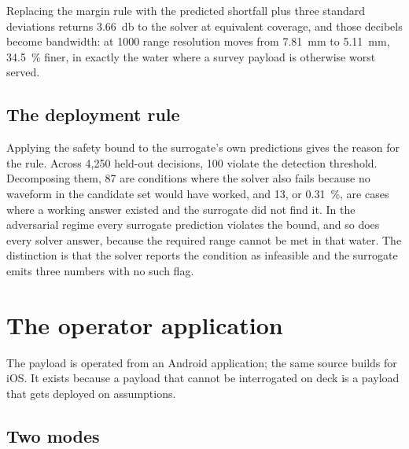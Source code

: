 \documentclass[11pt,a4paper]{article}
\begin{document}
Replacing the margin rule with the predicted shortfall plus three standard
deviations returns \SI{3.66}{\decibel} to the solver at equivalent coverage,
and those decibels become bandwidth: at \SI{1000}{\NTU} range resolution moves
from \SI{7.81}{\milli\metre} to \SI{5.11}{\milli\metre},
\SI{34.5}{\percent} finer, in exactly the water where a survey payload is
otherwise worst served.

\subsection{The deployment rule}


Applying the safety bound to the surrogate's own predictions gives the reason
for the rule. Across 4{,}250 held-out decisions, 100 violate the detection
threshold. Decomposing them, 87 are conditions where the solver also fails
because no waveform in the candidate set would have worked, and 13, or
\SI{0.31}{\percent}, are cases where a working answer existed and the surrogate
did not find it. In the adversarial regime every surrogate prediction violates
the bound, and so does every solver answer, because the required range cannot
be met in that water. The distinction is that the solver reports the condition
as infeasible and the surrogate emits three numbers with no such flag.

\section{The operator application}
\label{sec:app}

The payload is operated from an Android application; the same source builds for
iOS. It exists because a payload that cannot be interrogated on deck is a
payload that gets deployed on assumptions.

\subsection{Two modes}
\end{document}
